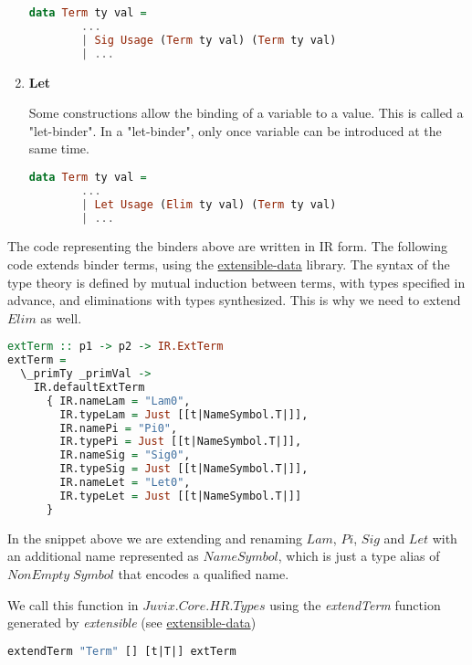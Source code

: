 \documentclass[acmsmall]{acmart}
\numberwithin{figure}{subsection}
\begin{document}
\begin{enumerate}
    \begin{lstlisting}[language=haskell]
data Term ty val = 
        ...
        | Sig Usage (Term ty val) (Term ty val)
        | ...
    \end{lstlisting}

    \item \textbf{Let}
    
    Some constructions allow the binding of a variable to a value. This is called a "let-binder". In a "let-binder", only once variable can be introduced at the same time.

    \begin{lstlisting}[language=haskell]
data Term ty val = 
        ...
        | Let Usage (Elim ty val) (Term ty val)
        | ...
    \end{lstlisting}
\end{enumerate}


The code representing the binders above are written in IR form.
The following code extends binder terms, using the \href{https://heliaxdev.github.io/extensible-data/Extensible.html}{extensible-data} library. The syntax of the type theory is defined by mutual induction between terms, with types specified in advance, and eliminations with types synthesized. This is why we need to extend $Elim$ as well.

\begin{lstlisting}[language=haskell]
extTerm :: p1 -> p2 -> IR.ExtTerm
extTerm =
  \_primTy _primVal ->
    IR.defaultExtTerm
      { IR.nameLam = "Lam0",
        IR.typeLam = Just [[t|NameSymbol.T|]],
        IR.namePi = "Pi0",
        IR.typePi = Just [[t|NameSymbol.T|]],
        IR.nameSig = "Sig0",
        IR.typeSig = Just [[t|NameSymbol.T|]],
        IR.nameLet = "Let0",
        IR.typeLet = Just [[t|NameSymbol.T|]]
      }
\end{lstlisting}

In the snippet above we are extending and renaming $Lam$, $Pi$, $Sig$ and $Let$ with an additional name represented as $NameSymbol$, which is just a type alias of $NonEmpty \; Symbol$ that encodes a qualified name.

We call this function in $Juvix.Core.HR.Types$ using the \textit{extendTerm} function generated by \textit{extensible} (see \href{https://heliaxdev.github.io/extensible-data/Extensible.html}{extensible-data})

\begin{lstlisting}[language=haskell]
extendTerm "Term" [] [t|T|] extTerm
\end{lstlisting}
\end{document}
